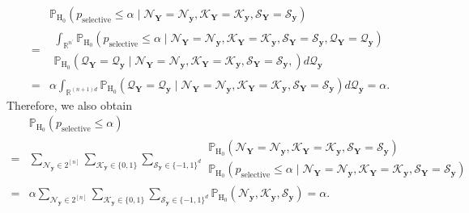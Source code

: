 \begin{align}
      &
    \mathbb{P}_{\mathrm{H}_0}
    \left(
    p_\mathrm{selective} \leq \alpha \mid
    \mathcal{N}_{\bm{Y}} = \mathcal{N}_{\bm{y}},
    \mathcal{K}_{\bm{Y}} = \mathcal{K}_{\bm{y}},
    \mathcal{S}_{\bm{Y}} = \mathcal{S}_{\bm{y}}
    \right)                                                                                                       \\
    = &
    \begin{multlined}
        \int_{\mathbb{R}^{n^\prime}}
        \mathbb{P}_{\mathrm{H}_0}
        \left(
        p_\mathrm{selective} \leq \alpha \mid
        \mathcal{N}_{\bm{Y}} = \mathcal{N}_{\bm{y}},
        \mathcal{K}_{\bm{Y}} = \mathcal{K}_{\bm{y}},
        \mathcal{S}_{\bm{Y}} = \mathcal{S}_{\bm{y}},
        \mathcal{Q}_{\bm{Y}} = \mathcal{Q}_{\bm{y}}
        \right) \\
        \mathbb{P}_{\mathrm{H}_0}
        \left(
        \mathcal{Q}_{\bm{Y}} = \mathcal{Q}_{\bm{y}} \mid
        \mathcal{N}_{\bm{Y}} = \mathcal{N}_{\bm{y}},
        \mathcal{K}_{\bm{Y}} = \mathcal{K}_{\bm{y}},
        \mathcal{S}_{\bm{Y}} = \mathcal{S}_{\bm{y}},
        \right)
        d\mathcal{Q}_{\bm{y}}
    \end{multlined} \\
    = & \alpha \int_{\mathbb{R}^{(n+1)d}}
    \mathbb{P}_{\mathrm{H}_0}
    \left(
    \mathcal{Q}_{\bm{Y}} = \mathcal{Q}_{\bm{y}} \mid
    \mathcal{N}_{\bm{Y}} = \mathcal{N}_{\bm{y}},
    \mathcal{K}_{\bm{Y}} = \mathcal{K}_{\bm{y}},
    \mathcal{S}_{\bm{Y}} = \mathcal{S}_{\bm{y}}
    \right)
    d\mathcal{Q}_{\bm{y}} = \alpha.
\end{align}
%
Therefore, we also obtain
%
\begin{align}
      &
    \mathbb{P}_{\mathrm{H}_0}(p_{\mathrm{selective}}\leq \alpha)                                              \\
    = &
    \sum_{\mathcal{N}_{\bm{y}}\in 2^{[n]}}
    \sum_{\mathcal{K}_{\bm{y}}\in \{0, 1\}}
    \sum_{\mathcal{S}_{\bm{y}}\in \{-1, 1\}^d}
    \begin{multlined}
        \mathbb{P}_{\mathrm{H}_0}
        (
        \mathcal{N}_{\bm{Y}} = \mathcal{N}_{\bm{y}},
        \mathcal{K}_{\bm{Y}} = \mathcal{K}_{\bm{y}},
        \mathcal{S}_{\bm{Y}} = \mathcal{S}_{\bm{y}}
        ) \\
        \mathbb{P}_{\mathrm{H}_0}
        \left(
        p_\mathrm{selective} \leq \alpha \mid
        \mathcal{N}_{\bm{Y}} = \mathcal{N}_{\bm{y}},
        \mathcal{K}_{\bm{Y}} = \mathcal{K}_{\bm{y}},
        \mathcal{S}_{\bm{Y}} = \mathcal{S}_{\bm{y}}
        \right)
    \end{multlined} \\
    = &
    \alpha
    \sum_{\mathcal{N}_{\bm{y}}\in 2^{[n]}}
    \sum_{\mathcal{K}_{\bm{y}}\in \{0, 1\}}
    \sum_{\mathcal{S}_{\bm{y}}\in \{-1, 1\}^d}
    \mathbb{P}_{\mathrm{H}_0}(\mathcal{N}_{\bm{y}}, \mathcal{K}_{\bm{y}}, \mathcal{S}_{\bm{y}})
    = \alpha.
\end{align}
%

